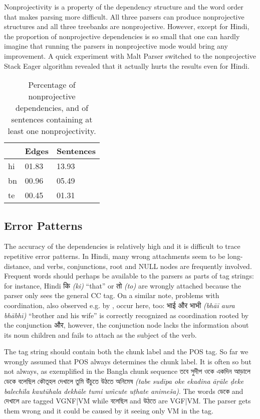 \documentclass[11pt]{article}
\newcommand{\hi}[1]{{\hifont #1}}
\newcommand{\bn}[1]{{\bnfont #1}}
\newcommand{\translit}[1]{{\translitfont \textit{(#1)}}}
\begin{document}
Nonprojectivity is a property of the dependency structure and the word order \citep{neproj} that makes parsing more difficult. All three parsers can produce nonprojective structures and all three treebanks are nonprojective. However, except for Hindi, the proportion of nonprojective dependencies is so small that one can hardly imagine that running the parsers in nonprojective mode would bring any improvement. A quick experiment with Malt Parser switched to the nonprojective Stack Eager algorithm revealed that it actually hurts the results even for Hindi.

\begin{table}[ht]
\begin{centering}
\begin{tabular}{l|ll}
& \textbf{Edges} & \textbf{Sentences} \\
\hline
hi & 01.83 & 13.93\\
bn & 00.96 & 05.49\\
te & 00.45 & 01.31\\
\end{tabular}
\caption{Percentage of nonprojective dependencies, and of sentences containing at least one nonprojectivity.}
\label{tab:nonprojectivity}
\end{centering}
\end{table}

\subsection{Error Patterns}
\label{sec:errors}

The accuracy of the dependencies is relatively high and it is difficult to trace repetitive error patterns. In Hindi, many wrong attachments seem to be long-distance, and verbs, conjunctions, root and NULL nodes are frequently involved. Frequent words should perhaps be available to the parsers as parts of tag strings: for instance, Hindi \hi{कि} \translit{ki} ``that'' or \hi{तो} \translit{to} are wrongly attached because the parser only sees the general CC tag. On a similar note, problems with coordination, also observed e.g. by \citet{dzparser}, occur here, too: \hi{भाई और भाभी} \translit{bhāī aura bhābhī} ``brother and his wife'' is correctly recognized as coordination rooted by the conjunction \hi{और}, however, the conjunction node lacks the information about its noun children and fails to attach as the subject of the verb.

The tag string should contain both the chunk label and the POS tag. So far we wrongly assumed that POS always determines the chunk label. It is often so but not always, as exemplified in the Bangla chunk sequence \bn{তবে সুদীপ ওকে একদিন আড়ালে ডেকে বলেছিল কৌতূহল দেখালে তুমি উঁচুতে উঠতে অনিমেষ} \translit{tabe sudīpa oke ekadina āṛāle ḍeke balechila kautūhala dekhāle tumi um̃cute uṭhate animeša}. The words \bn{ডেকে} and \bn{দেখালে} are tagged VGNF|VM while \bn{বলেছিল} and \bn{উঠতে} are VGF|VM. The parser gets them wrong and it could be caused by it seeing only VM in the tag.
\end{document}

